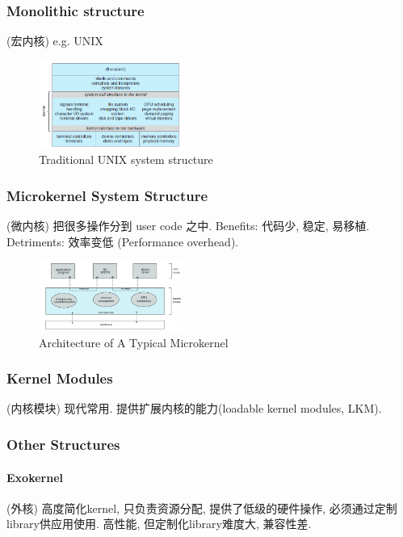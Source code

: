 \subsubsection{Monolithic structure}
(宏内核) e.g. UNIX
\begin{figure}[!htb]
    \centering
    \includegraphics[width=0.42\textwidth]{pic/OS2/Traditional UNIX system structure}
    \caption{Traditional UNIX system structure}
\end{figure}

\subsubsection{Microkernel System Structure}
(微内核) 把很多操作分到 user code 之中. 
Benefits: 代码少, 稳定, 易移植. 
Detriments: 效率变低 (Performance overhead). 


\begin{figure}[!htb]
    \centering
    \includegraphics[width=0.42\textwidth]{pic/OS2/Architecture of A Typical Microkernel}
    \caption{Architecture of A Typical Microkernel}
\end{figure}

\subsubsection{Kernel Modules}
(内核模块) 现代常用. 提供扩展内核的能力(loadable kernel modules, LKM). 

\subsubsection{Other Structures}
\paragraph{Exokernel} (外核) 高度简化kernel, 只负责资源分配, 提供了低级的硬件操作, 必须通过定制library供应用使用. 高性能, 但定制化library难度大, 兼容性差. 

